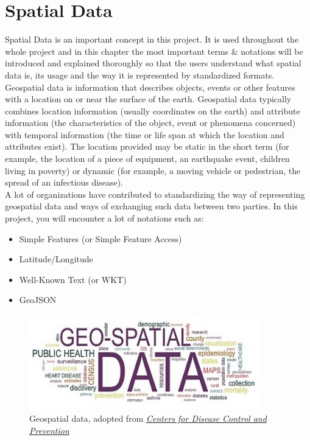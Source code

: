 \chapter{Spatial Data}\label{ch:spatial-data}
Spatial Data is an important concept in this project. It is used throughout the whole project and in this chapter the most
important terms \& notations will be introduced and explained thoroughly so that the users understand what spatial data is,
its usage and the way it is represented by standardized formats.\\
\newline
Geospatial data is information that describes objects, events or other features with a location on
or near the surface of the earth.
Geospatial data typically combines location information (usually coordinates on the earth) and attribute information
(the characteristics of the object, event or phenomena concerned) with temporal information
(the time or life span at which the location and attributes exist).
The location provided may be static in the short term (for example, the location of a piece of equipment,
an earthquake event, children living in poverty) or dynamic
(for example, a moving vehicle or pedestrian, the spread of an infectious disease). \cite{IBMGeoSpatialData}\\
\newline
A lot of organizations have contributed to standardizing the way of representing geospatial data and ways of
exchanging such data between two parties. In this project, you will encounter a lot of notations such as:
\begin{itemize}
    \item Simple Features (or Simple Feature Access)
    \item Latitude/Longitude
    \item Well-Known Text (or WKT)
    \item GeoJSON
\end{itemize}

\begin{figure}[H]
    \centering
    \includegraphics[width=10cm]{./Figures/Spatial_Data/geospatial_data.jpg}
    \caption{Geospatial data, adopted from \href{https://www.cdc.gov/dhdsp/maps/gisx/resources/geo-spatial-data.html}{\textit{Centers for Disease Control and Prevention}} \cite{CDC}}
\end{figure}
